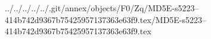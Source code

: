 ../../../../../.git/annex/objects/F0/Zq/MD5E-s5223--414b742d9367b75425957137363e63f9.tex/MD5E-s5223--414b742d9367b75425957137363e63f9.tex